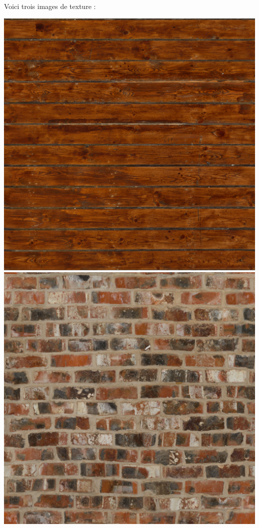 \documentclass[11pt,class=report,crop=false]{standalone}
\begin{document}
Voici trois images de texture :
\begin{center}
	\includegraphics[scale=\myscale,scale=0.61]{figures/carre-texture-wood}
	\qquad\qquad\qquad
	\includegraphics[scale=\myscale,scale=0.61]{figures/carre-texture-brick}

\end{center}
\end{document}
